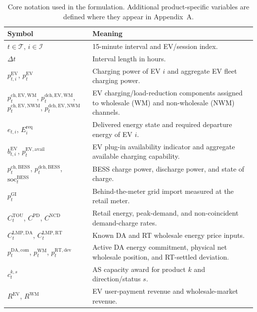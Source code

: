 \documentclass[final,5p,times]{elsarticle}
\newcommand{\DeltaT}{\Delta t}
\newcommand{\EV}{\mathrm{EV}}
\newcommand{\BESS}{\mathrm{BESS}}
\newcommand{\DA}{\mathrm{DA}}
\newcommand{\RT}{\mathrm{RT}}
\newcommand{\GI}{\mathrm{GI}}
\newcommand{\TOU}{\mathrm{TOU}}
\newcommand{\PD}{\mathrm{PD}}
\newcommand{\NCD}{\mathrm{NCD}}
\newcommand{\soc}{\mathrm{soc}}
\newcommand{\WM}{\mathrm{WM}}
\newcommand{\LMP}{\mathrm{LMP}}
\newcommand{\NWM}{\mathrm{NWM}}
\newcommand{\ch}{\mathrm{ch}}
\newcommand{\dch}{\mathrm{dch}}
\newcommand{\req}{\mathrm{req}}
\newcommand{\avail}{\mathrm{avail}}
\newcommand{\calT}{\mathcal{T}}
\newcommand{\calI}{\mathcal{I}}
\begin{document}
\begin{table}[!t]
\centering
\caption{Core notation used in the formulation. Additional product-specific variables are defined where they appear in Appendix~A.}
\label{tab:notation_core}
\scriptsize
\begin{tabularx}{\textwidth}{@{}p{}p{}@{}}
\toprule
Symbol & Meaning \\
\midrule
$t\in\calT$, $i\in\calI$ & 15-minute interval and EV/session index.\\
$\DeltaT$ & Interval length in hours.\\
$p_{t,i}^{\EV}$, $p_t^{\EV}$ & Charging power of EV $i$ and aggregate EV fleet charging power.\\
$p_t^{\ch,\EV,\WM}$, $p_t^{\dch,\EV,\WM}$, $p_t^{\ch,\EV,\NWM}$, $p_t^{\dch,\EV,\NWM}$ & EV charging/load-reduction components assigned to wholesale (WM) and non-wholesale (NWM) channels.\\
$e_{t,i}$, $E_i^{\req}$ & Delivered energy state and required departure energy of EV $i$.\\
$b_{t,i}^{\EV}$, $p_t^{\EV,\avail}$ & EV plug-in availability indicator and aggregate available charging capability.\\
$p_t^{\ch,\BESS}$, $p_t^{\dch,\BESS}$, $\soc_t^{\BESS}$ & BESS charge power, discharge power, and state of charge.\\
$p_t^{\GI}$ & Behind-the-meter grid import measured at the retail meter.\\
$C_t^{\TOU}$, $C^{\PD}$, $C^{\NCD}$ & Retail energy, peak-demand, and non-coincident demand-charge rates.\\
$C_t^{\LMP,\DA}$, $C_t^{\LMP,\RT}$ & Known DA and RT wholesale energy price inputs.\\
$p_t^{\DA,\mathrm{com}}$, $p_t^{\WM}$, $p_t^{\RT,\mathrm{dev}}$ & Active DA energy commitment, physical net wholesale position, and RT-settled deviation.\\
$c_t^{k,s}$ & AS capacity award for product $k$ and direction/status $s$.\\
$R^{\EV}$, $R^{\WM}$ & EV user-payment revenue and wholesale-market revenue.\\
\bottomrule
\end{tabularx}
\end{table}
\end{document}
